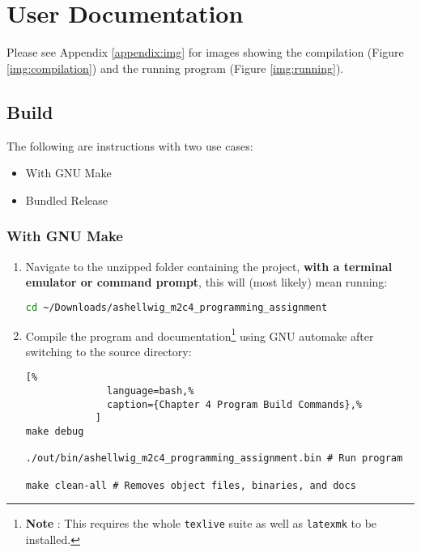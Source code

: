 \documentclass[a4paper, 11pt]{article}
\begin{document}
  \newpage
  
  \section{User Documentation}
    Please see Appendix \ref{appendix:img} for images showing the compilation
      (Figure \ref{img:compilation}) and the running program (Figure
      \ref{img:running}).

    \subsection{Build}
      The following are instructions with two use cases:
      \begin{itemize}
        \item With GNU Make
        \item Bundled Release
      \end{itemize}
      \subsubsection{With GNU Make}
        \begin{enumerate}
          \item Navigate to the unzipped folder containing the project,
            \textbf{with a terminal emulator or command prompt}, this will
            (most likely) mean running:
            \begin{lstlisting}[language=bash]
cd ~/Downloads/ashellwig_m2c4_programming_assignment
            \end{lstlisting}
          \item Compile the program and documentation\footnote{\textbf{Note%
            }: This requires the whole \texttt{texlive} suite as well as
            \texttt{latexmk} to be installed.} using GNU automake after
            switching to the source directory:
            \begin{lstlisting}[%
              language=bash,%
              caption={Chapter 4 Program Build Commands},%
            ]
make debug

./out/bin/ashellwig_m2c4_programming_assignment.bin # Run program

make clean-all # Removes object files, binaries, and docs
            \end{lstlisting}
          \end{enumerate}
\end{document}
